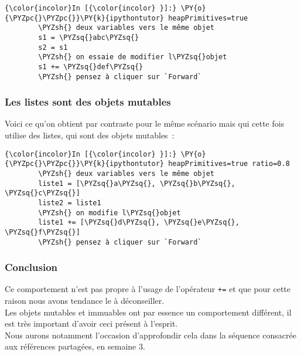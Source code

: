     \begin{Verbatim}[commandchars=\\\{\}]
{\color{incolor}In [{\color{incolor} }]:} \PY{o}{\PYZpc{}\PYZpc{}}\PY{k}{ipythontutor} heapPrimitives=true
        \PYZsh{} deux variables vers le même objet
        s1 = \PYZsq{}abc\PYZsq{}
        s2 = s1
        \PYZsh{} on essaie de modifier l\PYZsq{}objet
        s1 += \PYZsq{}def\PYZsq{}
        \PYZsh{} pensez à cliquer sur `Forward`
\end{Verbatim}


    \hypertarget{les-listes-sont-des-objets-mutables}{%
\subsubsection{Les listes sont des objets
mutables}\label{les-listes-sont-des-objets-mutables}}

    Voici ce qu'on obtient par contraste pour le même scénario mais qui
cette fois utilise des listes, qui sont des objets mutables~:

    \begin{Verbatim}[commandchars=\\\{\}]
{\color{incolor}In [{\color{incolor} }]:} \PY{o}{\PYZpc{}\PYZpc{}}\PY{k}{ipythontutor} heapPrimitives=true ratio=0.8
        \PYZsh{} deux variables vers le même objet
        liste1 = [\PYZsq{}a\PYZsq{}, \PYZsq{}b\PYZsq{}, \PYZsq{}c\PYZsq{}]
        liste2 = liste1
        \PYZsh{} on modifie l\PYZsq{}objet
        liste1 += [\PYZsq{}d\PYZsq{}, \PYZsq{}e\PYZsq{}, \PYZsq{}f\PYZsq{}]
        \PYZsh{} pensez à cliquer sur `Forward`
\end{Verbatim}


    \hypertarget{conclusion}{%
\subsubsection{Conclusion}\label{conclusion}}

    Ce comportement n'est pas propre à l'usage de l'opérateur \texttt{+=} et
que pour cette raison nous avons tendance le à déconseiller.\\


Les objets mutables et immuables ont par essence un comportement
différent, il est très important d'avoir ceci présent à l'esprit.\\

Nous aurons notamment l'occasion d'approfondir cela dans la séquence
consacrée aux références partagées, en semaine 3.